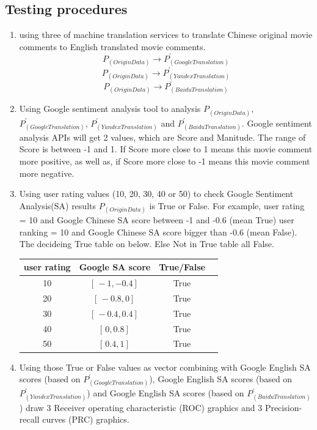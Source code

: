 \documentclass[conference]{IEEEtran}
\begin{document}
\begin{CJK*}{UTF8}{gbsn}
\subsection{Testing procedures}
\begin{enumerate}
  \item using three of machine translation services to translate Chinese
    original movie comments to English translated movie comments.
    $$P_{(Origin Data)} \rightarrow P^{\prime}_{(Google Translation)}$$
    $$P_{(Origin Data)} \rightarrow P^{\prime}_{(Yandex Translation)}$$
    $$P_{(Origin Data)} \rightarrow P^{\prime}_{(Baidu Translation)}$$
  \item Using Google sentiment analysis tool to analysis $P_{(Origin Data)}$,
    $P^{\prime}_{(Google Translation)}$, $ P^{\prime}_{(Yandex Translation)}$ and $
    P^{\prime}_{(Baidu Translation)}$. Google sentiment analysis APIs will get 2
    values, which are Score and Manitude. The range of Score is between -1 and
    1. If Score more close to 1 means this movie comment more positive, as well
    as, if Score more close to -1 means this movie comment more negative.
  \item Using user rating values (10, 20, 30, 40 or 50) to check Google
    Sentiment Analysis(SA) results $P_{(Origin Data)} $ is True or False. For example, user rating = 10 and Google Chinese SA score between -1
    and -0.6 (mean True) user ranking = 10 and Google Chinese SA score bigger
    than -0.6 (mean False). The decideing True table on below. Else Not in True
    table all False.\\
    \begin{center}
      \begin{tabular}{|c|c|c|c|}
        \hline
        user rating & Google SA score & True/False \\
        \hline\hline
        10 & $[ \, -1, -0.4 ] \,$ & True \\
        \hline
        20 & $[ \, -0.8, 0 ] \,$ & True \\
        \hline
        30 & $[ \, -0.4, 0.4 ] \,$ & True \\
        \hline
        40 & $[ \, 0, 0.8 ] \,$ & True \\
        \hline
        50 & $[ \, 0.4, 1 ] \,$ & True \\
        \hline
      \end{tabular}
    \end{center}
  \item Using those True or False values as vector combining with Google English
    SA scores (based on $P^{\prime}_{(Google Translation)}$), Google English SA
    scores (based on $ P^{\prime}_{(Yandex Translation)}$) and Google English SA
    scores (based on $P^{\prime}_{(Baidu Translation)}$) draw 3 Receiver operating
    characteristic (ROC) graphics and 3 Precision-recall curves (PRC) graphics.


\end{enumerate}
\end{CJK*}
\end{document}
